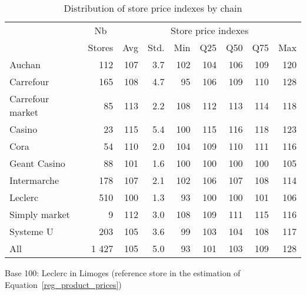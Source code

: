 \documentclass[english]{article}
\begin{document}
\begin{table}
\caption{Distribution of store price indexes by chain}
\label{tab:store_price_indexes}
\begin{threeparttable}
    \begin{tabular}{lr|rrrrrrr}
    \toprule
    \toprule
          & \multicolumn{1}{c|}{Nb} & \multicolumn{7}{c}{Store price indexes} \\
          & \multicolumn{1}{c|}{Stores} & \multicolumn{1}{c}{Avg} & \multicolumn{1}{c}{Std.} & \multicolumn{1}{c}{Min} & \multicolumn{1}{c}{Q25} & \multicolumn{1}{c}{Q50} & \multicolumn{1}{c}{Q75} & \multicolumn{1}{c}{Max} \\
    \midrule
    Auchan & 112   & 107   & 3.7   & 102   & 104   & 106   & 109   & 120 \\
    Carrefour & 165   & 108   & 4.7   & 95    & 106   & 109   & 110   & 128 \\
    Carrefour market & 85    & 113   & 2.2   & 108   & 112   & 113   & 114   & 118 \\
    Casino & 23    & 115   & 5.4   & 100   & 115   & 116   & 118   & 123 \\
    Cora  & 54    & 110   & 2.0   & 104   & 109   & 110   & 111   & 116 \\
    Geant Casino & 88    & 101   & 1.6   & 100   & 100   & 100   & 100   & 105 \\
    Intermarche & 178   & 107   & 2.1   & 102   & 106   & 107   & 108   & 114 \\
    Leclerc & 510   & 100   & 1.3   & 93    & 100   & 100   & 101   & 106 \\
    Simply market & 9     & 112   & 3.0   & 108   & 109   & 111   & 115   & 116 \\
    Systeme U & 203   & 105   & 3.6   & 99    & 103   & 104   & 108   & 117 \\
    \midrule
    All   & 1 427 & 105   & 5.0   & 93    & 101   & 103   & 109   & 128 \\
    \bottomrule
    \bottomrule
    \end{tabular}
\begin{tablenotes}
      \small
      \item Base 100: Leclerc in Limoges (reference store in the estimation of Equation~\ref{reg_product_prices})
\end{tablenotes}
\end{threeparttable}
\end{table}
\end{document}

